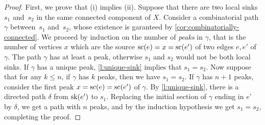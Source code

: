 \begin{proof}
First, we prove that (i) implies (ii). 
    Suppose that there are two local sinks~$s_1$ and~$s_2$ in the same connected component of $X$.
    Consider a combinatorial path $\gamma$ between~$s_1$ and~$s_2$, whose existence is garanteed by \cref{cor:combinatorially-connected}.
    We proceed by induction on the number of \emph{peaks} in $\gamma$, that is the number of vertices $x$ which are the source $\mathrm{sc}(e)=x=\mathrm{sc}(e')$ of two edges $e,e'$ of $\gamma$.
    The path $\gamma$ has at least a peak, otherwise $s_1$ and $s_2$ would not be both local sinks. 
    If $\gamma$ has a unique peak, \cref{l:unique-sink} implies that $s_1=s_2$.
    Now suppose that for any $k \leq n$, if $\gamma$ has $k$ peaks, then we have $s_1=s_2$. 
    If $\gamma$ has $n+1$ peaks, consider the first peak $x=\mathrm{sc}(e)=\mathrm{sc}(e')$ of $\gamma$. 
    By \cref{l:unique-sink}, there is a directed path $\delta$ from $\mathrm{sk}(e')$ to $s_1$. 
    Replacing the initial section of $\gamma$ ending in $e’$ by $\delta$, we get a path with $n$ peaks, and by the induction hypothesis we get $s_1=s_2$, completing the proof.


\end{proof}
